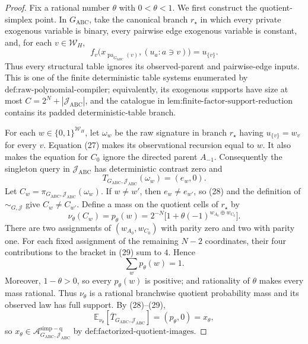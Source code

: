 \documentclass{article}
\begin{document}
\begin{proof}
Fix a rational number \(\theta\) with \(0<\theta<1\).  We first construct the quotient-simplex point.  In \(G_{\mathrm{ABC}}\), take the canonical branch \(r_\star\) in which every private exogenous variable is binary, every pairwise edge exogenous variable is constant, and, for each \(v\in\mathcal W_H\),
\[
f_v\bigl(x_{\operatorname{pa}_{G_{\mathrm{ABC}}}(v)},(u_a:a\ni v)\bigr)=u_{\{v\}}.
\tag{27}
\]
Thus every structural table ignores its observed-parent and pairwise-edge inputs.  This is one of the finite deterministic table systems enumerated by \(\text{def:raw-polynomial-compiler}\); equivalently, its exogenous supports have size at most \(C=2^N+|\mathcal J_{\mathrm{ABC}}|\), and the catalogue in \(\text{lem:finite-factor-support-reduction}\) contains its padded deterministic-table branch.

For each \(w\in\{0,1\}^{\mathcal W_H}\), let \(\omega_w\) be the raw signature in branch \(r_\star\) having \(u_{\{v\}}=w_v\) for every \(v\).  Equation (27) makes its observational recursion equal to \(w\).  It also makes the equation for \(C_0\) ignore the directed parent \(A_{-1}\).  Consequently the singleton query in \(\mathcal J_{\mathrm{ABC}}\) has deterministic contrast zero and
\[
T_{G_{\mathrm{ABC}},\mathcal J_{\mathrm{ABC}}}(\omega_w)=(e_w,0).
\tag{28}
\]
Let \(C_w=\pi_{G_{\mathrm{ABC}},\mathcal J_{\mathrm{ABC}}}(\omega_w)\).  If \(w\ne w'\), then \(e_w\ne e_{w'}\), so (28) and the definition of \(\sim_{G,\mathcal J}\) give \(C_w\ne C_{w'}\).  Define a mass on the quotient cells of \(r_\star\) by
\[
\nu_\theta(C_w)=p_\theta(w)
=2^{-N}\bigl[1+\theta(-1)^{w_{A_0}\oplus w_{C_0}}\bigr].
\tag{29}
\]
There are two assignments of \((w_{A_0},w_{C_0})\) with parity zero and two with parity one.  For each fixed assignment of the remaining \(N-2\) coordinates, their four contributions to the bracket in (29) sum to \(4\).  Hence
\[
\sum_w p_\theta(w)=1.
\]
Moreover, \(1-\theta>0\), so every \(p_\theta(w)\) is positive; and rationality of \(\theta\) makes every mass rational.  Thus \(\nu_\theta\) is a rational branchwise quotient probability mass and its observed law has full support.  By (28)--(29),
\[
\mathbb E_{\nu_\theta}[\overline T_{G_{\mathrm{ABC}},\mathcal J_{\mathrm{ABC}}}]
=(p_\theta,0)=x_\theta,
\]
so \(x_\theta\in\mathcal A_{G_{\mathrm{ABC}},\mathcal J_{\mathrm{ABC}}}^{\mathrm{simp-q}}\) by \(\text{def:factorized-quotient-images}\).


\end{proof}
\end{document}
